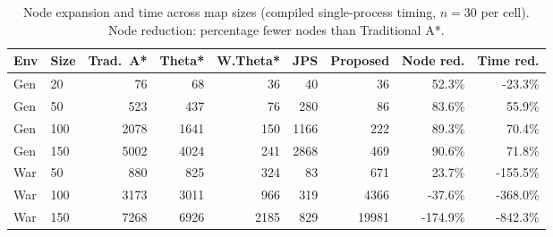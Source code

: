 \begin{table}[htbp]
\centering\small
\caption{Node expansion and time across map sizes (compiled single-process timing, $n=30$ per cell). Node reduction: percentage fewer nodes than Traditional A*.}\label{tab:scale}
\begin{tabular}{llrrrrrrr}
\toprule
Env & Size & Trad.~A* & Theta* & W.Theta* & JPS & Proposed & Node red. & Time red. \\
\midrule
Gen & 20 & 76 & 68 & 36 & 40 & 36 & 52.3\% & -23.3\% \\
Gen & 50 & 523 & 437 & 76 & 280 & 86 & 83.6\% & 55.9\% \\
Gen & 100 & 2078 & 1641 & 150 & 1166 & 222 & 89.3\% & 70.4\% \\
Gen & 150 & 5002 & 4024 & 241 & 2868 & 469 & 90.6\% & 71.8\% \\
War & 50 & 880 & 825 & 324 & 83 & 671 & 23.7\% & -155.5\% \\
War & 100 & 3173 & 3011 & 966 & 319 & 4366 & -37.6\% & -368.0\% \\
War & 150 & 7268 & 6926 & 2185 & 829 & 19981 & -174.9\% & -842.3\% \\
\bottomrule
\end{tabular}
\end{table}
